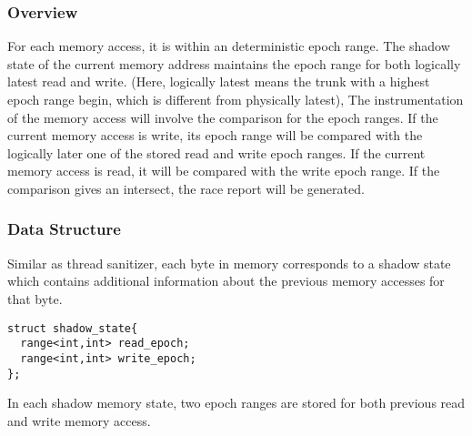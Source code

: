 \subsubsection{Overview}
For each memory access, it is within an deterministic epoch range. 
The shadow state of the current memory address maintains the epoch range for both logically latest read and write. 
(Here, logically latest means the trunk with a highest epoch range begin, which is different from physically latest), 
The instrumentation of the memory access will involve the comparison for the epoch ranges. If the current memory access is write,
its epoch range will be compared with the logically later one of the stored read and write epoch ranges.
If the current memory access is read, it will be compared with the write epoch range. 
If the comparison gives an intersect, the race report will be generated.
\subsubsection{Data Structure}
Similar as thread sanitizer, each byte in memory corresponds to a shadow state which contains additional information about the previous memory accesses for that byte.
\lstset{language=C++}
\begin{lstlisting}[caption=Structure of a shadow state]
struct shadow_state{
  range<int,int> read_epoch;
  range<int,int> write_epoch;
};
\end{lstlisting}
In each shadow memory state, two epoch ranges are stored for both previous read and write memory access.

